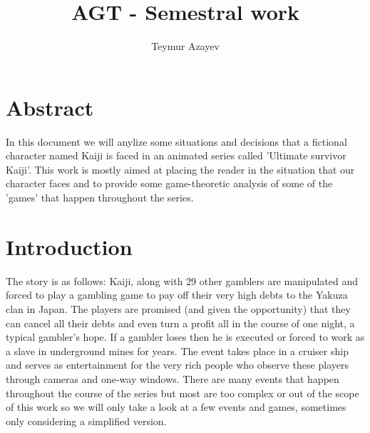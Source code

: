 \documentclass[11pt]{article}
\title{\textbf{AGT - Semestral work}}
\author{Teymur Azayev\\}
\date{}
\begin{document}
\maketitle


\section{Abstract}
In this document we will anylize some situations and decisions
that a fictional character named Kaiji is faced in an animated series called 'Ultimate survivor Kaiji'.  
This work is mostly aimed at placing the reader in the situation that our character faces and to provide some
game-theoretic analysis of some of the 'games' that happen throughout the series. 

\section{Introduction}
The story is as follows: Kaiji, along with 29 other gamblers are manipulated and forced to play a gambling game 
to pay off their very high debts to the Yakuza clan in Japan. The players are promised (and given the opportunity) that they can cancel all their debts and even turn a profit all in the course of one night, a typical gambler's hope. If a gambler loses then he is executed or forced to work as a slave in underground mines for years. The event takes place in a cruiser ship and serves as entertainment for the very rich people who observe these players through cameras and one-way windows. There are many events that happen throughout the course of the series but most
are too complex or out of the scope of this work so we will only take a look at a few events and games, sometimes
only considering a simplified version.
\end{document}
